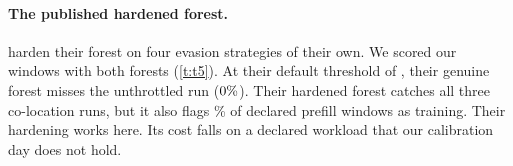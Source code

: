 \paragraph{The published hardened forest.}
\citet{gargiulo2026} harden their forest on four evasion strategies of their own. We
scored our windows with both forests (\cref{t:t5}). At their default threshold of
\DefaultDecision, their genuine forest misses the
unthrottled run ($0\%$). Their hardened forest catches all three
co-location runs, but it also flags \GkHardPrefill\% of declared prefill windows as
training. Their hardening works here. Its cost falls on a declared workload that our
calibration day does not hold.

\begin{table}[!htbp]
  \centering
  \small
  
  \caption{Forests fitted by the recipe of \citet{gargiulo2026} (G\&K) on their corpus,
    scored on our windows: per cent flagged training. The first rows are a
    transfer gate (training $\geq$ \GateTrain\%, declared
    $\leq$ \GateInf\%). Both forests pass. The hardened forest passes the declared
    row only because decode outnumbers prefill. Their chain and ours differ in rate
    and anti-alias filtering, and their own-data check fell short of their reported
    accuracy (\cref{a:gk}).}
  \label{t:t5}
\end{table}
